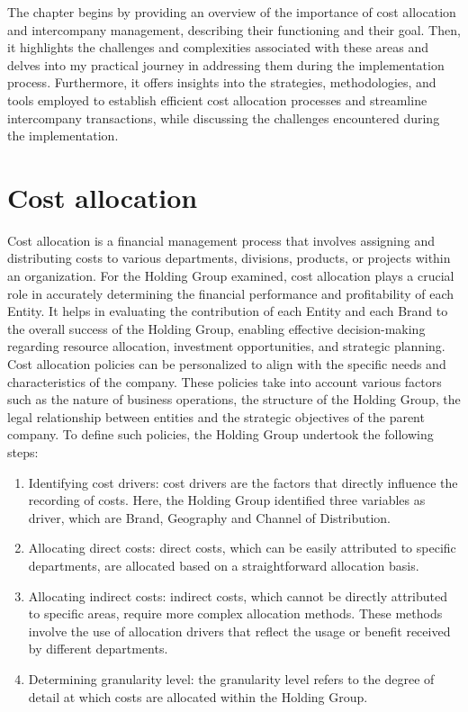 \documentclass[12pt,a4paper,openright,twoside]{book}
\begin{document}
The chapter begins by providing an overview of the importance of cost allocation and intercompany management, describing their functioning and their goal.
%
Then, it highlights the challenges and complexities associated with these areas and delves into my practical journey in addressing them during the implementation process.
%
Furthermore, it offers insights into the strategies, methodologies, and tools employed to establish efficient cost allocation processes and streamline intercompany transactions, while discussing the challenges encountered during the implementation.

\section{Cost allocation}

Cost allocation is a financial management process that involves assigning and distributing costs to various departments, divisions, products, or projects within an organization. 
%
For the Holding Group examined, cost allocation plays a crucial role in accurately determining the financial performance and profitability of each Entity.
%
It helps in evaluating the contribution of each Entity and each Brand to the overall success of the Holding Group, enabling effective decision-making regarding resource allocation, investment opportunities, and strategic planning.
%
Cost allocation policies can be personalized to align with the specific needs and characteristics of the company. 
%
These policies take into account various factors such as the nature of business operations, the structure of the Holding Group, the legal relationship between entities and the strategic objectives of the parent company.
%
To define such policies, the Holding Group undertook the following steps:

\begin{enumerate}
    \item Identifying cost drivers: cost drivers are the factors that directly influence the recording of costs. Here, the Holding Group identified three variables as driver, which are Brand, Geography and Channel of Distribution.
    \item Allocating direct costs: direct costs, which can be easily attributed to specific departments, are allocated based on a straightforward allocation basis.
    \item Allocating indirect costs: indirect costs, which cannot be directly attributed to specific areas, require more complex allocation methods. These methods involve the use of allocation drivers that reflect the usage or benefit received by different departments.
    \item Determining granularity level: the granularity level refers to the degree of detail at which costs are allocated within the Holding Group. 
\end{enumerate}
\end{document}
